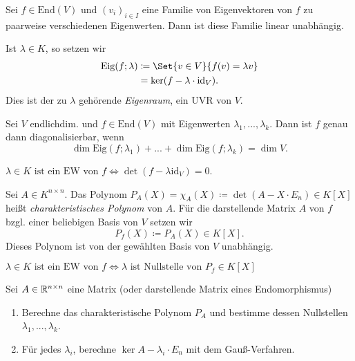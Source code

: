 \documentclass{cheat-sheet}
\newcommand{\End}{\mathrm{End}}
\newcommand{\Eig}{\mathrm{Eig}}
\newcommand{\id}{\mathrm{id}}
\begin{document}
\begin{satz}
Sei $f \in \End(V)$ und $(v_i)_{i \in I}$ eine Familie von Eigenvektoren von $f$ zu paarweise verschiedenen Eigenwerten. Dann ist diese Familie linear unabhängig.
\end{satz}

\begin{defn}
Ist $\lambda \in K$, so setzen wir
\begin{align*}
\Eig(f; \lambda) &\coloneqq \Set{ v \in V }{ f(v) = \lambda v }\\
&= \ker(f - \lambda \cdot \id_V).
\end{align*}
Dies ist der zu $\lambda$ gehörende \emph{Eigenraum}, ein UVR von $V$.
\end{defn}

\begin{satz}
Sei $V$ endlichdim. und $f \in \End(V)$ mit Eigenwerten $\lambda_1, ..., \lambda_k$. Dann ist $f$ genau dann diagonalisierbar, wenn
\[ \dim \Eig(f; \lambda_1) + ... + \dim \Eig(f; \lambda_k) = \dim V. \]
\end{satz}

\begin{satz}
$\lambda \in K \text{ ist ein EW von } f \iff \det(f - \lambda \id_V) = 0$.
\end{satz}

\begin{defn}
Sei $A \in K^{n \times n}$. Das Polynom $P_A(X) = \chi_A(X) \coloneqq \det(A - X \cdot E_n) \in K[X]$ heißt \emph{charakteristisches Polynom} von $A$. Für die darstellende Matrix $A$ von $f$ bzgl. einer beliebigen Basis von $V$ setzen wir
\[ P_f(X) \coloneqq P_A(X) \in K[X]. \]
Dieses Polynom ist von der gewählten Basis von $V$ unabhängig.
\end{defn}

\begin{satz}
$\lambda \in K \text{ ist ein EW von } f \iff \lambda \text{ ist Nullstelle von } P_f \in K[X]$
\end{satz}

\begin{verf}
Sei $A \in \mathbb{R}^{n \times n}$ eine Matrix (oder darstellende Matrix eines Endomorphismus)
\begin{enumerate}
  \item Berechne das charakteristische Polynom $P_A$ und bestimme dessen Nullstellen $\lambda_1, ..., \lambda_k$.
  \item Für jedes $\lambda_i$, berechne $\ker A - \lambda_i \cdot E_n$ mit dem Gauß-Verfahren.
\end{enumerate}
\end{verf}
\end{document}
